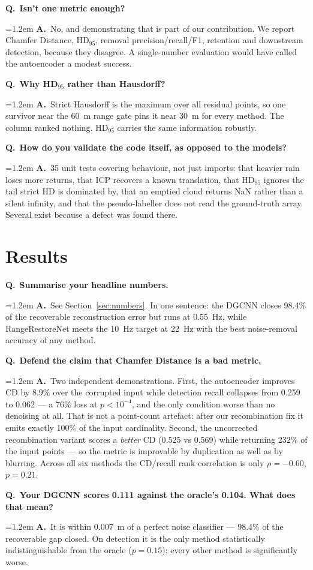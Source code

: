 \documentclass[11pt,a4paper]{article}
\newcommand{\Q}[1]{\medskip\noindent\textcolor{qcol}{\textbf{Q.}}\ \textbf{#1}\par\nopagebreak}
\newcommand{\A}[1]{\noindent\hangindent=1.2em\hangafter=0 \textcolor{inkcol}{\textbf{A.}}\ #1\par}
\begin{document}
\Q{Isn't one metric enough?}
\A{No, and demonstrating that is part of our contribution. We report Chamfer
Distance, HD$_{95}$, removal precision/recall/F1, retention and downstream
detection, because they disagree. A single-number evaluation would have
called the autoencoder a modest success.}

\Q{Why HD$_{95}$ rather than Hausdorff?}
\A{Strict Hausdorff is the maximum over all residual points, so one survivor
near the 60~m range gate pins it near 30~m for every method. The column
ranked nothing. HD$_{95}$ carries the same information robustly.}

\Q{How do you validate the code itself, as opposed to the models?}
\A{35 unit tests covering behaviour, not just imports: that heavier rain
loses more returns, that ICP recovers a known translation, that HD$_{95}$
ignores the tail strict HD is dominated by, that an emptied cloud returns NaN
rather than a silent infinity, and that the pseudo-labeller does not read the
ground-truth array. Several exist because a defect was found there.}

\section{Results}

\Q{Summarise your headline numbers.}
\A{See Section~\ref{sec:numbers}. In one sentence: the DGCNN closes 98.4\% of
the recoverable reconstruction error but runs at 0.55~Hz, while
RangeRestoreNet meets the 10~Hz target at 22~Hz with the best noise-removal
accuracy of any method.}

\Q{Defend the claim that Chamfer Distance is a bad metric.}
\A{Two independent demonstrations. First, the autoencoder improves CD by
8.9\% over the corrupted input while detection recall collapses from 0.259 to
0.062 --- a 76\% loss at $p<10^{-4}$, and the only condition worse than no
denoising at all. That is not a point-count artefact: after our recombination
fix it emits exactly 100\% of the input cardinality. Second, the uncorrected
recombination variant scores a \emph{better} CD (0.525 vs 0.569) while
returning 232\% of the input points --- so the metric is improvable by
duplication as well as by blurring. Across all six methods the CD/recall rank
correlation is only $\rho=-0.60$, $p=0.21$.}

\Q{Your DGCNN scores 0.111 against the oracle's 0.104. What does that mean?}
\A{It is within 0.007~m of a perfect noise classifier --- 98.4\% of the
recoverable gap closed. On detection it is the only method statistically
indistinguishable from the oracle ($p=0.15$); every other method is
significantly worse.}
\end{document}
